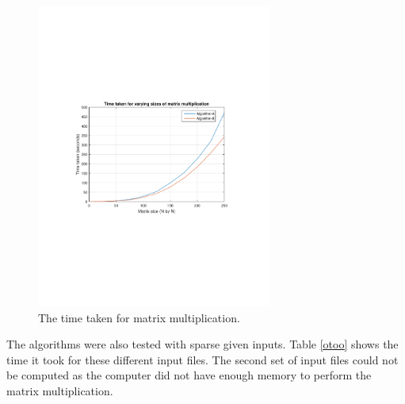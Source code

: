 \documentclass[10pt,onecolumn]{article}
\begin{document}
\newpage

\begin{figure}[h!]
\centering
\includegraphics[width=\columnwidth,height=100mm]{graph.pdf}
\centering
\caption{The time taken for matrix multiplication.}
\label{graph}
\end{figure}

\noindent The algorithms were also tested with sparse given inputs. Table \ref{otoo} shows the time it took for these different input files. The second set of input files could not be computed as the computer did not have enough memory to perform the matrix multiplication.
\end{document}
